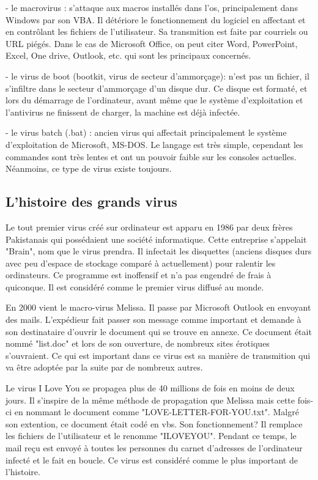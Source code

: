 - le macrovirus   : s'attaque aux macros installés dans l'os, principalement dans Windows par son VBA. Il détériore le fonctionnement du logiciel en affectant et en contrôlant les fichiers de l'utilisateur. Sa transmition est faite par courriels ou URL piégés. Dans le cas de Microsoft Office, on peut citer Word, PowerPoint, Excel, One drive, Outlook, etc. qui sont les principaux concernés.

- le virus de boot (bootkit, virus de secteur d'ammorçage): n'est pas un  fichier, il s'infiltre dans le secteur d'ammorçage d'un disque dur. Ce disque est formaté, et lors du démarrage de l'ordinateur, avant même que le système d'exploitation et l'antivirus ne finissent de charger, la machine est déjà infectée.   

- le virus batch (.bat) : ancien virus qui affectait principalement le système d'exploitation de Microsoft, MS-DOS. Le langage est très simple, cependant les commandes sont très lentes et ont un pouvoir faible sur les consoles actuelles. Néanmoins, ce type de virus existe toujours.
  

\subsection{L'histoire des grands virus}
Le tout premier virus créé sur ordinateur est apparu en 1986 par deux frères Pakistanais qui possédaient une société informatique. Cette entreprise s'appelait "Brain", nom que le virus prendra. Il infectait les disquettes (anciens disques durs avec peu d'espace de stockage comparé à actuellement) pour ralentir les ordinateurs. Ce programme est inoffensif et n'a pas engendré de frais à quiconque. Il est considéré comme le premier virus diffusé au monde. 

En 2000 vient le macro-virus Melissa. Il passe par Microsoft Outlook en envoyant des mails. L'expédieur fait passer son message comme important et demande à son destinataire d'ouvrir le document qui se trouve en annexe. Ce document était nommé "list.doc" et lors de son ouverture, de nombreux sites érotiques s'ouvraient. Ce qui est important dans ce virus est sa manière de transmition qui va être adoptée par la suite par de nombreux autres.

Le virus I Love You se propagea plus de 40 millions de fois en moins de deux jours. Il s'inspire de la même méthode de propagation que Melissa mais cette fois-ci en nommant le document comme "LOVE-LETTER-FOR-YOU.txt". Malgré son extention, ce document était codé en vbs. Son fonctionnement? Il remplace les fichiers de l'utilisateur et le renomme "ILOVEYOU". Pendant ce temps, le mail reçu est envoyé à toutes les personnes du carnet d'adresses de l'ordinateur infecté et le fait en boucle. Ce virus est considéré comme le plus important de l'histoire.   
    
